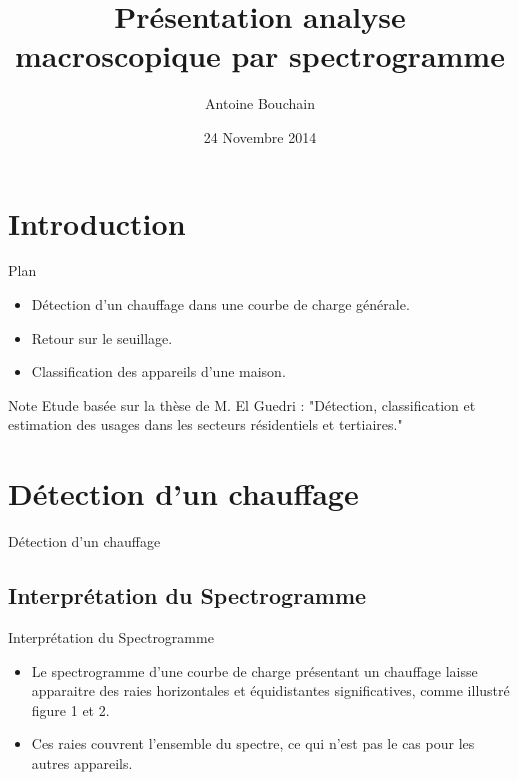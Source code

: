 \documentclass{beamer}
\title[Your Short Title]{Présentation analyse macroscopique par spectrogramme}
\author{Antoine Bouchain}
\date{24 Novembre 2014}
\begin{document}
\begin{frame}
  \titlepage
\end{frame}


\section{Introduction}

\begin{frame}{Plan}

\begin{itemize}
  \item Détection d'un chauffage dans une courbe de charge générale.
  \item Retour sur le seuillage.
  \item Classification des appareils d'une maison.
\end{itemize}

\vskip 1cm

\begin{block}{Note}
Etude basée sur la thèse de M. El Guedri : "Détection, classification et estimation des usages dans les secteurs résidentiels et tertiaires."
\end{block}

\end{frame}

\section{Détection d'un chauffage}

\begin{frame}{Détection d'un chauffage}
\end{frame}

\subsection{Interprétation du Spectrogramme}

\begin{frame}{Interprétation du Spectrogramme}
\begin{itemize}
	\item Le spectrogramme d'une courbe de charge présentant un chauffage laisse apparaitre des raies horizontales et équidistantes significatives, comme illustré figure 1 et 2.
	\item Ces raies couvrent l'ensemble du spectre, ce qui n'est pas le cas pour les autres appareils.
\end{itemize}
\end{frame}
\end{document}
